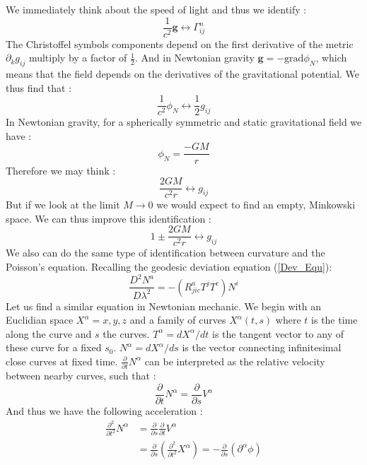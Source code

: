 \documentclass[a4paper,12pt]{article}
\theoremstyle{definition}
\begin{document}
We immediately think about the speed of light and thus we identify :
\begin{equation}
	\frac{1}{c^2} \boldsymbol{g} \longleftrightarrow \Gamma^n_{ij}
\end{equation}
The Christoffel symbols components depend on the first derivative of the metric $\partial_kg_{ij}$ multiply by a factor of $\frac{1}{2}$.
And in Newtonian gravity $\boldsymbol{g}=-\text{grad}\phi_N$, which means that the field depends on the derivatives of the gravitational potential.
We thus find that :
\begin{equation}
	\frac{1}{c^2}\phi_N \longleftrightarrow \frac{1}{2}g_{ij}
\end{equation}
In Newtonian gravity, for a spherically symmetric and static gravitational field we have :
\begin{equation}
	\phi_N=\frac{-GM}{r}
\end{equation}
Therefore we may think :
\begin{equation}
	\frac{2GM}{c^2r} \longleftrightarrow g_{ij}
\end{equation}
But if we look at the limit $M\rightarrow 0$ we would expect to find an empty, Minkowski space.
We can thus improve this identification :
\begin{equation}
	1\pm\frac{2GM}{c^2r} \longleftrightarrow g_{ij}
\end{equation}
We also can do the same type of identification between curvature and the Poisson's equation.
Recalling the geodesic deviation equation (\ref{Dev_Equ}):
\begin{equation}\label{Dev_Equ2}
	\frac{D^2N^a}{D\lambda^2}=-(R_{jic}^aT^jT^c)N^i
\end{equation}
Let us find a similar equation in Newtonian mechanic.
We begin with an Euclidian space $X^\alpha={x,y,z}$ and a family of curves $X^\alpha(t,s)$ where $t$ is the time along the curve and $s$ the curves.
$T^\alpha=dX^\alpha/dt$ is the tangent vector to any of these curve for a fixed $s_0$.
$N^\alpha=dX^\alpha/ds$ is the vector connecting infinitesimal close curves at fixed time.
$\frac{\partial}{\partial t}N^\alpha$ can be interpreted as the relative velocity between nearby curves, such that :
\begin{equation}
	\frac{\partial}{\partial t}N^\alpha=\frac{\partial}{\partial s}V^\alpha
\end{equation}
And thus we have the following acceleration :
\begin{equation}
\begin{split}
	\frac{\partial^2}{\partial t^2}N^\alpha&=\frac{\partial}{\partial s}\frac{\partial}{\partial t}V^\alpha \\
	&=\frac{\partial}{\partial s}(\frac{\partial^2}{\partial t^2}X^\alpha)=-\frac{\partial}{\partial s}(\partial^\alpha \phi)
\end{split}
\end{equation}
\end{document}
